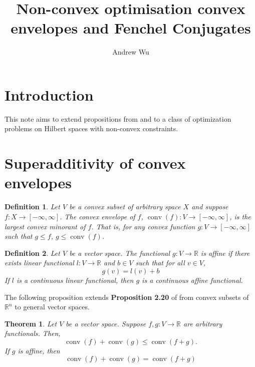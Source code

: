\documentclass[11pt]{article}
\title{Non-convex optimisation convex envelopes and Fenchel Conjugates}
\author{Andrew Wu}
\newtheorem{definition}{Definition}
\newtheorem{theorem}{Theorem}
\DeclareMathOperator*{\conv}{conv}
\newcommand{\R}{\mathbb{R}}
\newcommand{\Prob}[1]{\mathscr{P}_{#1}}
\begin{document}
	
	\maketitle
	
	\section{Introduction}
	This note aims to extend propositions from \cite{Bauschke2010} and \cite{Tardella} to a class of optimization problems on Hilbert spaces with non-convex constraints.
	
	\begin{comment}
	\section{Problem}
	Let $X,Y$ be Hilbert spaces and suppose $f:X\times Y\to\R$ is a smooth convex function and  $g:X\times Y\to\R$ is non-convex. We want to solve the following problem, denoted by $\Prob{0}$
	\begin{equation*}
		\inf_{x,y\in X\times Y} f(x,y)
		\end{equation*}
	subject to the constraint 
	\[	g(x,y) \geq 0.
		\]
	\end{comment}
	\section{Superadditivity of convex envelopes}
	\begin{definition}
		Let $V$ be a convex subset of arbitrary space $X$ and suppose $f:X\to[-\infty,\infty]$. The convex envelope of $f$, $\conv(f):V\to[-\infty,\infty]$, is the largest convex minorant of $f$. That is, for any convex function $g:V\to[-\infty, \infty]$ such that $g\leq f$, $g\leq \conv(f)$.
		\end{definition}
	\begin{definition}
		Let $V$ be a vector space. The functional $g:V\to\R$ is affine if there exists linear functional $l:V\to\R$ and $b\in V$ such that for all $v\in V$, 
		\[  g(v) = l(v) + b
		\]
		If $l$ is a continuous linear functional, then $g$ is a continuous affine functional.
	\end{definition}
	\noindent The following proposition extends \textbf{Proposition 2.20} of \cite{Tardella} from convex subsets of $\R^{n}$ to general vector spaces.
	
	\begin{theorem}
		\label{prop:conv}
		Let $V$ be a vector space. Suppose $f,g:V\to\R$ are arbitrary functionals. Then, 
		\[  \conv(f) + \conv(g)\leq \conv(f+g).
		\]
		If $g$ is affine, then 
		\[  \conv(f) + \conv(g) = \conv(f + g)
		\]
	\end{theorem}
	
\end{document}

